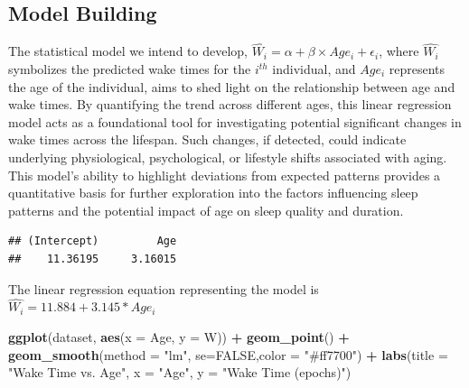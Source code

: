 \documentclass[
]{article}
\newenvironment{Shaded}{\begin{snugshade}}{\end{snugshade}}
\newcommand{\AttributeTok}[1]{\textcolor[rgb]{0.13,0.29,0.53}{#1}}
\newcommand{\ConstantTok}[1]{\textcolor[rgb]{0.56,0.35,0.01}{#1}}
\newcommand{\FunctionTok}[1]{\textcolor[rgb]{0.13,0.29,0.53}{\textbf{#1}}}
\newcommand{\NormalTok}[1]{#1}
\newcommand{\OtherTok}[1]{\textcolor[rgb]{0.56,0.35,0.01}{#1}}
\newcommand{\SpecialCharTok}[1]{\textcolor[rgb]{0.81,0.36,0.00}{\textbf{#1}}}
\newcommand{\StringTok}[1]{\textcolor[rgb]{0.31,0.60,0.02}{#1}}
\begin{document}
\hypertarget{model-building-1}{%
\subsection{Model Building}\label{model-building-1}}

The statistical model we intend to develop,
\(\hat{W_{i}} = \alpha + \beta \times Age_{i} + \epsilon_{i}\), where
\(\hat{W_{i}}\) symbolizes the predicted wake times for the \(i^{th}\)
individual, and \(Age_{i}\) represents the age of the individual, aims
to shed light on the relationship between age and wake times. By
quantifying the trend across different ages, this linear regression
model acts as a foundational tool for investigating potential
significant changes in wake times across the lifespan. Such changes, if
detected, could indicate underlying physiological, psychological, or
lifestyle shifts associated with aging. This model's ability to
highlight deviations from expected patterns provides a quantitative
basis for further exploration into the factors influencing sleep
patterns and the potential impact of age on sleep quality and duration.

\begin{Shaded}
\end{Shaded}

\begin{verbatim}
## (Intercept)         Age 
##    11.36195     3.16015
\end{verbatim}

The linear regression equation representing the model is
\(\hat{W_{i}} = 11.884 + 3.145*Age_{i}\)

\begin{Shaded}
\begin{Highlighting}[]
\FunctionTok{ggplot}\NormalTok{(dataset, }\FunctionTok{aes}\NormalTok{(}\AttributeTok{x =}\NormalTok{ Age, }\AttributeTok{y =}\NormalTok{ W)) }\SpecialCharTok{+} 
  \FunctionTok{geom\_point}\NormalTok{() }\SpecialCharTok{+} 
  \FunctionTok{geom\_smooth}\NormalTok{(}\AttributeTok{method =} \StringTok{"lm"}\NormalTok{, }\AttributeTok{se=}\ConstantTok{FALSE}\NormalTok{,}\AttributeTok{color =} \StringTok{"\#ff7700"}\NormalTok{) }\SpecialCharTok{+} 
  \FunctionTok{labs}\NormalTok{(}\AttributeTok{title =} \StringTok{"Wake Time vs. Age"}\NormalTok{, }\AttributeTok{x =} \StringTok{"Age"}\NormalTok{, }\AttributeTok{y =} \StringTok{"Wake Time (epochs)"}\NormalTok{)}
\end{Highlighting}
\end{Shaded}
\end{document}
